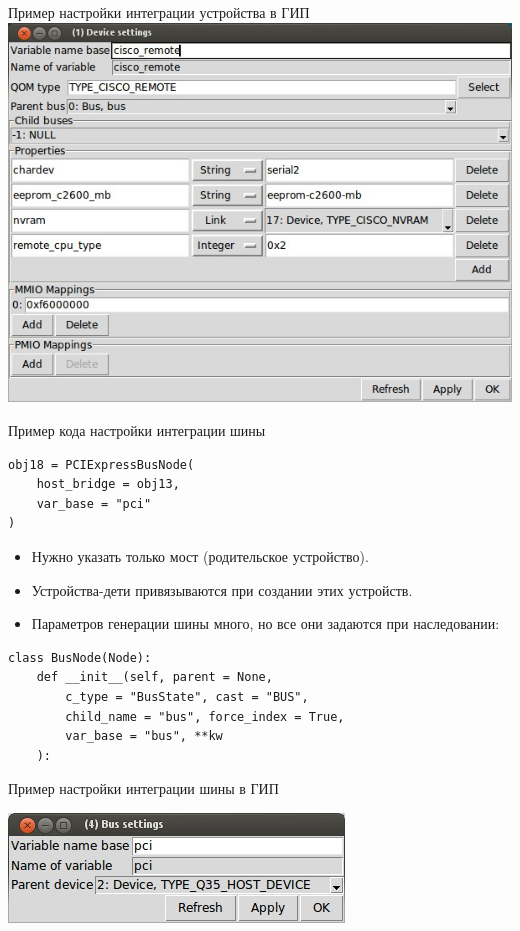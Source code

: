 \documentclass[unicode,hyperref={unicode=true}]{beamer}
\theoremstyle{definition}
\theoremstyle{plain}
\begin{document}
\begin{frame}{Пример настройки интеграции устройства в ГИП}
\includegraphics[height=0.9\textheight]{REMOTE.jpg}
\end{frame}



\begin{frame}[fragile]{Пример кода настройки интеграции шины}
\lstset{language=Python}
\begin{lstlisting}
obj18 = PCIExpressBusNode(
    host_bridge = obj13,
    var_base = "pci"
)
\end{lstlisting}
\vfill
\begin{itemize}
\item Нужно указать только мост (родительское устройство).
\item Устройства-дети привязываются при создании этих устройств.
\item Параметров генерации шины много, но все они задаются при наследовании:
\end{itemize}
\vfill
\lstset{language=Python}
\begin{lstlisting}
class BusNode(Node):
    def __init__(self, parent = None,
        c_type = "BusState", cast = "BUS",
        child_name = "bus", force_index = True,
        var_base = "bus", **kw
    ):
\end{lstlisting}
\end{frame}



\begin{frame}{Пример настройки интеграции шины в ГИП}
\begin{center}
\includegraphics[width=0.7\linewidth]{bus_widget.jpg}
\end{center}
\end{frame}
\end{document}
